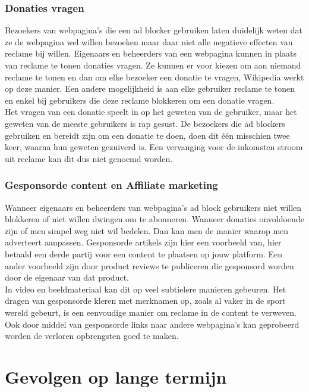 \documentclass[pdftex,a4paper,12pt,twoside]{report}
\begin{document}
\subsection{Donaties vragen}
\label{sec Donaties vragen}
Bezoekers van webpagina's die een ad blocker gebruiken laten duidelijk weten dat ze de webpagina wel willen bezoeken maar daar niet alle negatieve effecten van reclame bij willen. Eigenaars en beheerders van een webpagina kunnen in plaats van reclame te tonen donaties vragen. Ze kunnen er voor kiezen om aan niemand reclame te tonen en dan om elke bezoeker een donatie te vragen, Wikipedia werkt op deze manier. Een andere mogelijkheid is aan elke gebruiker reclame te tonen en enkel bij gebruikers die deze reclame blokkeren om een donatie vragen.
\\
Het vragen van een donatie speelt in op het geweten van de gebruiker, maar het geweten van de meeste gebruikers is rap gesust. De bezoekers die ad blockers gebruiken en bereidt zijn om een donatie te doen, doen dit één misschien twee keer, waarna hun geweten gezuiverd is. Een vervanging voor de inkomsten stroom uit reclame kan dit dus niet genoemd worden.


\subsection{Gesponsorde content en \gls{Affiliate marketing}}
\label{sec Gesponsorde content en Affiliate marketing}
Wanneer eigenaars en beheerders van webpagina's ad block gebruikers niet willen blokkeren of niet willen dwingen om te abonneren. Wanneer donaties onvoldoende zijn of men simpel weg niet wil bedelen. Dan kan men de manier waarop men adverteert aanpassen. Gesponsorde artikels zijn hier een voorbeeld van, hier betaald een derde partij voor een content te plaatsen op jouw platform. Een ander voorbeeld zijn door product reviews te publiceren die gesponsord worden door de eigenaar van dat product. 
\\
In video en beeldmateriaal kan dit op veel subtielere manieren gebeuren. Het dragen van gesponsorde kleren met merknamen op, zoals al vaker in de sport wereld gebeurt, is een eenvoudige manier om reclame in de content te verweven.
\\
Ook door middel van gesponsorde links naar andere webpagina's kan geprobeerd worden de verloren opbrengsten goed te maken.
\chapter{Gevolgen op lange termijn}
\label{ch:Gevolgen op lange termijn}
\end{document}

